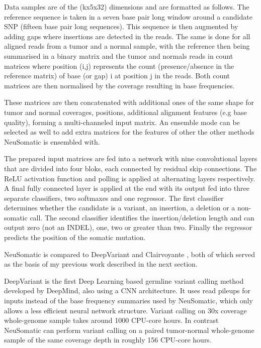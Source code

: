 \documentclass[bsc,frontabs,singlespacing,parskip,deptreport]{infthesis}
\begin{document}
Data samples are of the (kx5x32) dimensions and are formatted as follows. The reference sequence is taken in a seven base pair long window around a candidate SNP (fifteen base pair long sequences). This sequence is then augmented by adding gaps where insertions are detected in the reads. The same is done for all aligned reads from a tumor and a normal sample, with the reference then being summarised in a binary matrix and the tumor and normals reads in count matrices where position (i,j) represents the count (presence/absence in the reference matrix) of base (or gap) i at position j in the reads. Both count matrices are then normalised by the coverage resulting in base frequencies.

These matrices are then concatenated with additional ones of the same shape for tumor and normal coverages, positions, additional alignment features (e.g base quality), forming a multi-channeled input matrix. An ensemble mode can be selected as well to add extra matrices for the features of other the other methods NeuSomatic is ensembled with.

The prepared input matrices are fed into a network with nine convolutional layers that are divided into four bloks, each connected by residual skip connections. The ReLU activation function and polling is applied at alternating layers respectively. A final fully connected layer is applied at the end with its output fed into three separate classifiers, two softmaxes and one regressor. The first classifier determines whether the candidate is a variant, an insertion, a deletion or a non-somatic call. The second classifier identifies the insertion/deletion length and can output zero (not an INDEL), one, two or greater than two. Finally the regressor predicts the position of the somatic mutation.

NeuSomatic is compared to DeepVariant \cite{deepvariant} and Clairvoyante \cite{clairvoyante}, both of which served as the basis of my previous work described in the next section.

DeepVariant is the first Deep Learning based germline variant calling method developed by DeepMind, also using a CNN architecture. It uses read pileups for inputs instead of the base frequency summaries used by NeuSomatic, which only allows a less efficient neural network structure. Variant calling on 30x coverage whole-genome sample takes around 1000 CPU-core hours. In contrast NeuSomatic can perform variant calling on a paired tumor-normal whole-genome sample of the same coverage depth in roughly 156 CPU-core hours.
\end{document}

